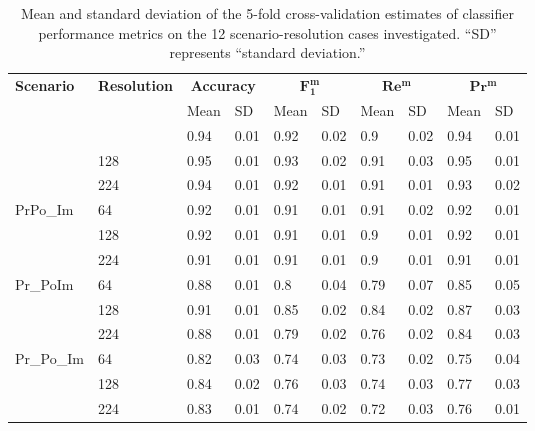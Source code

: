 \documentclass[NewProceedindgs, NoLineNumbers, SectionNumbers, letterpaper, SingleSpace, InsideFigs]{ascelike-new}
\begin{document}
\begin{table}[ht]\small\centering
\caption{Mean and standard deviation of the 5-fold cross-validation estimates of classifier performance metrics on the 12 scenario-resolution cases investigated. ``SD'' represents ``standard deviation.''}
\label{tab:meanstd}
\begin{tabular}{llllllllll}\toprule
\multirow{3}{*}{\textbf{Scenario}} &  
\multirow{3}{*}{\textbf{Resolution}}  & \multicolumn{2}{c}{\textbf{Accuracy}} & \multicolumn{2}{c}{$\bm{F_1^m}$} 
& \multicolumn{2}{c}{$\bm{Re^m}$} & \multicolumn{2}{c}{$\bm{Pr^m}$} \\%
                          &            & Mean & SD  & Mean & SD  & Mean & SD  & Mean & SD  \\\midrule
\multirow{3}{*}{Pr\_Im}    & 64        & 0.94 & 0.01 & 0.92 & 0.02 & 0.9  & 0.02 & 0.94 & 0.01 \\
                          & 128        & 0.95 & 0.01 & 0.93 & 0.02 & 0.91 & 0.03 & 0.95 & 0.01 \\
                          & 224        & 0.94 & 0.01 & 0.92 & 0.01 & 0.91 & 0.01 & 0.93 & 0.02 \\\midrule
\multirow{3}{*}{PrPo\_Im}  & 64         & 0.92 & 0.01 & 0.91 & 0.01 & 0.91 & 0.02 & 0.92 & 0.01 \\
                          & 128        & 0.92 & 0.01 & 0.91 & 0.01 & 0.9  & 0.01 & 0.92 & 0.01 \\
                          & 224        & 0.91 & 0.01 & 0.91 & 0.01 & 0.9  & 0.01 & 0.91 & 0.01 \\\midrule
\multirow{3}{*}{Pr\_PoIm}  & 64         & 0.88 & 0.01 & 0.8  & 0.04 & 0.79 & 0.07 & 0.85 & 0.05 \\
                          & 128        & 0.91 & 0.01 & 0.85 & 0.02 & 0.84 & 0.02 & 0.87 & 0.03 \\
                          & 224        & 0.88 & 0.01 & 0.79 & 0.02 & 0.76 & 0.02 & 0.84 & 0.03 \\\midrule
\multirow{3}{*}{Pr\_Po\_Im} & 64         & 0.82 & 0.03 & 0.74 & 0.03 & 0.73 & 0.02 & 0.75 & 0.04 \\
                          & 128        & 0.84 & 0.02 & 0.76 & 0.03 & 0.74 & 0.03 & 0.77 & 0.03 \\
                          & 224        & 0.83 & 0.01 & 0.74 & 0.02 & 0.72 & 0.03 & 0.76 & 0.01\\ \bottomrule
\end{tabular}
\end{table}
\end{document}
